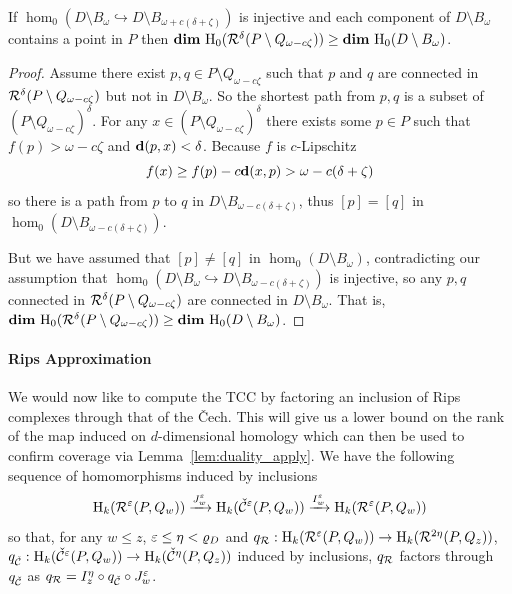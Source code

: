 \begin{lemma}\label{lem:assumption2}
  If $\hom_0(D\setminus B_\omega\hookrightarrow D\setminus B_{\omega+c(\delta+\zeta)})$ is injective and each component of $D\setminus B_\omega$ contains a point in $P$ then $\mathbf{dim}~\mathrm{H}_0(\mathcal{R}^\delta(P\setminus Q_{\omega-c\zeta})) \geq \mathbf{dim}~\mathrm{H}_0(D\setminus B_\omega)$.
\end{lemma}
\begin{proof}
  Assume there exist $p,q \in P\setminus Q_{\omega-c\zeta}$ such that $p$ and $q$ are connected in $\mathcal{R}^\delta(P\setminus Q_{\omega-c\zeta})$ but not in $D\setminus B_\omega$.
  So the shortest path from $p, q$ is a subset of $(P\setminus Q_{\omega-c\zeta})^\delta$.
  For any $x\in (P\setminus Q_{\omega-c\zeta})^\delta$ there exists some $p\in P$ such that $f(p) > \omega - c\zeta$ and $\mathbf{d}(p,x) < \delta$.
  Because $f$ is $c$-Lipschitz
  \[ f(x)\geq f(p) - c\mathbf{d}(x,p) > \omega - c(\delta+\zeta)\]
  so there is a path from $p$ to $q$ in $D\setminus B_{\omega-c(\delta+\zeta)}$, thus $[p] = [q]$ in $\hom_0(D\setminus B_{\omega-c(\delta+\zeta)})$.

  But we have assumed that $[p]\neq[q]$ in $\hom_0(D\setminus B_\omega)$, contradicting our assumption that $\hom_0(D\setminus B_\omega\hookrightarrow D\setminus B_{\omega-c(\delta+\zeta)})$ is injective, so any $p,q$ connected in $\mathcal{R}^\delta(P\setminus Q_{\omega-c\zeta})$ are connected in $D\setminus B_\omega$.
  That is, $\mathbf{dim}~\mathrm{H}_0(\mathcal{R}^\delta(P\setminus Q_{\omega-c\zeta}))\geq \mathbf{dim}~\mathrm{H}_0(D\setminus B_\omega)$.
\end{proof}

\paragraph{Rips Approximation}

We would now like to compute the TCC by factoring an inclusion of Rips complexes through that of the \v Cech.
This will give us a lower bound on the rank of the map induced on $d$-dimensional homology which can then be used to confirm coverage via Lemma~\ref{lem:duality_apply}.
We have the following sequence of homomorphisms induced by inclusions
\[ \mathrm{H}_k(\mathcal{R}^\varepsilon(P, Q_w))\xrightarrow{J_w^\varepsilon}\mathrm{H}_k(\check{\mathcal{C}}^\varepsilon(P, Q_w))\xrightarrow{I_w^\varepsilon}\mathrm{H}_k(\mathcal{R}^\varepsilon(P, Q_w))\]
so that, for any $w\leq z$, $\varepsilon\leq\eta < \varrho_D$ and $q_{\mathcal{R}} : \mathrm{H}_k(\mathcal{R}^\varepsilon(P, Q_w))\to \mathrm{H}_k(\mathcal{R}^{2\eta}(P, Q_z))$, $q_{\check{\mathcal{C}}} : \mathrm{H}_k(\check{\mathcal{C}}^\varepsilon(P, Q_w))\to \mathrm{H}_k(\check{\mathcal{C}}^{\eta}(P, Q_z))$ induced by inclusions, $q_{\mathcal{R}}$ factors through $q_{\check{\mathcal{C}}}$ as $q_{\mathcal{R}} = I_z^\eta\circ q_{\check{\mathcal{C}}}\circ J_w^\varepsilon$.

